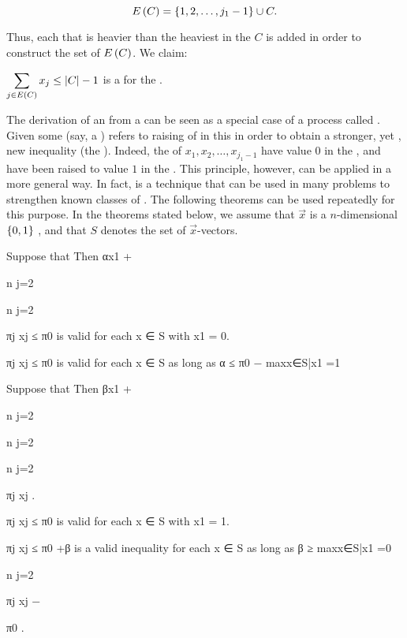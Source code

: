 \begin{equation}
\fun{E}{C}=\accl{1,2,\ldots,j_1-1}\cup C.
\end{equation}

Thus, each  that is heavier than the heaviest  in the  $C$ is added in order to construct the set of  $\fun{E}{C}$. We claim:

\begin{theorem}
$\sumdomain[j]{\fun{E}{C}}{x_j}\leq\abs{C}-1$ is a  for the .
\end{theorem}

The derivation of an  from a  can be seen as a special case of a process called . Given some  (say, a )  refers to raising  of  in this  in order to obtain a stronger, yet , new inequality (the ). Indeed, the  of  $x_1,x_2,\ldots,x_{j_1-1}$ have value $0$ in the , and have been raised to value $1$ in the . This principle, however, can be applied in a more general way. In fact,  is a technique that can be used in many problems to
strengthen known classes of . The following theorems can be used repeatedly for this purpose. In the theorems stated below, we assume that $\vec{x}$ is a $n$-dimensional $\accl{0,1}$ , and that $S$ denotes the set of  $\vec{x}$-vectors.

\begin{theorem}
Suppose that Then αx1 +

n
j=2

n
j=2

πj xj ≤ π0 is valid for each x ∈ S with x1 = 0.

πj xj ≤ π0 is valid for each x ∈ S as long as α ≤ π0 − maxx∈S|x1 =1
\end{theorem}

\begin{theorem}
Suppose that
Then βx1 +

n
j=2

n
j=2

n
j=2

πj xj .

πj xj ≤ π0 is valid for each x ∈ S with x1 = 1.

πj xj ≤ π0 +β is a valid inequality for each x ∈ S as long as β ≥ maxx∈S|x1 =0

n
j=2

πj xj −

π0 .
\end{theorem}

